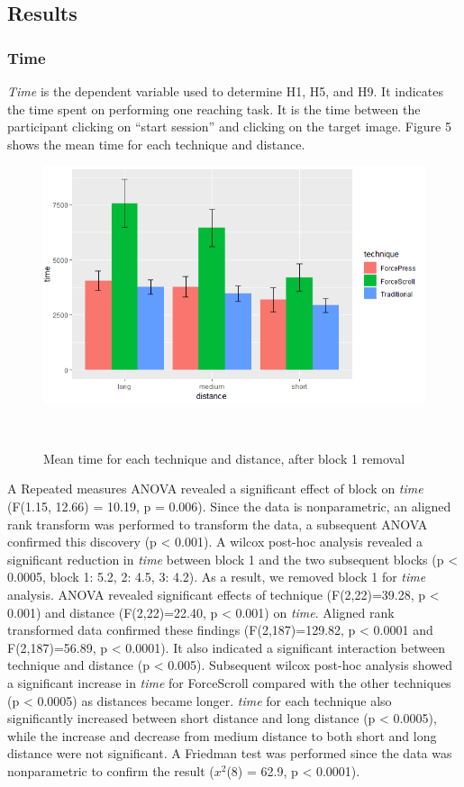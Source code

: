 \documentclass{sigchi}
\begin{document}
\subsection{Results}
\subsubsection{Time}
\textit{Time} is the dependent variable used to determine H1, H5, and H9. It indicates the time spent on performing one reaching task. It is the time between the participant clicking on ``start session'' and clicking on the target image. Figure 5 shows the mean time for each technique and distance.
\begin{figure}[!h]
    \centering
    \includegraphics[width=0.8\columnwidth]{figures/figure4}
    \caption{Mean time for each technique and distance, after block 1 removal}~\label{fig:figure5}
\end{figure}
 
A Repeated measures ANOVA revealed a significant effect of block on \textit{time} (F(1.15, 12.66) = 10.19, p = 0.006). Since the data is nonparametric, an aligned rank transform was performed to transform the data, a subsequent ANOVA confirmed this discovery (p < 0.001). A wilcox post-hoc analysis revealed a significant reduction in \textit{time} between block 1 and the two subsequent blocks (p < 0.0005, block 1: 5.2, 2: 4.5, 3: 4.2). As a result, we removed block 1 for \textit{time} analysis. ANOVA revealed significant effects of technique (F(2,22)=39.28, p < 0.001) and distance (F(2,22)=22.40, p < 0.001) on \textit{time}. Aligned rank transformed data confirmed these findings (F(2,187)=129.82, p < 0.0001 and F(2,187)=56.89, p < 0.0001). It also indicated a significant interaction between technique and distance (p < 0.005). Subsequent wilcox post-hoc analysis showed a significant increase in \textit{time} for ForceScroll compared with the other techniques (p < 0.0005) as distances became longer. \textit{time} for each technique also significantly increased between short distance and long distance (p < 0.0005), while the increase and decrease from medium distance to both short and long distance were not significant. A Friedman test was performed since the data was nonparametric to confirm the result ($x^{2}$(8) = 62.9, p < 0.0001).
\end{document}
